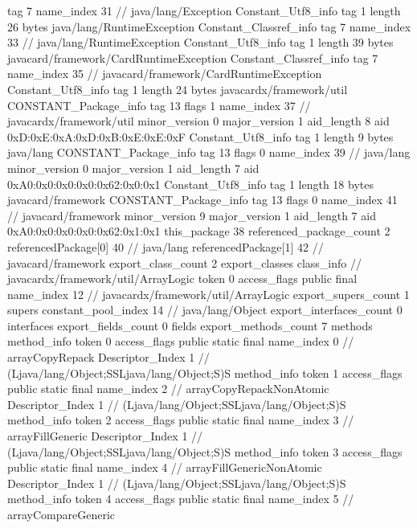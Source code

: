 {{{			tag	7
			name_index	31		// java/lang/Exception
		}
		Constant_Utf8_info {
			tag	1
			length	26
			bytes	java/lang/RuntimeException
		}
		Constant_Classref_info {
			tag	7
			name_index	33		// java/lang/RuntimeException
		}
		Constant_Utf8_info {
			tag	1
			length	39
			bytes	javacard/framework/CardRuntimeException
		}
		Constant_Classref_info {
			tag	7
			name_index	35		// javacard/framework/CardRuntimeException
		}
		Constant_Utf8_info {
			tag	1
			length	24
			bytes	javacardx/framework/util
		}
		CONSTANT_Package_info {
			tag	13
			flags	1
			name_index	37		// javacardx/framework/util
			minor_version	0
			major_version	1
			aid_length	8
			aid	0xD:0xE:0xA:0xD:0xB:0xE:0xE:0xF
		}
		Constant_Utf8_info {
			tag	1
			length	9
			bytes	java/lang
		}
		CONSTANT_Package_info {
			tag	13
			flags	0
			name_index	39		// java/lang
			minor_version	0
			major_version	1
			aid_length	7
			aid	0xA0:0x0:0x0:0x0:0x62:0x0:0x1
		}
		Constant_Utf8_info {
			tag	1
			length	18
			bytes	javacard/framework
		}
		CONSTANT_Package_info {
			tag	13
			flags	0
			name_index	41		// javacard/framework
			minor_version	9
			major_version	1
			aid_length	7
			aid	0xA0:0x0:0x0:0x0:0x62:0x1:0x1
		}
	}
	this_package	38
	referenced_package_count	2
	referencedPackage[0]	40		// java/lang
	referencedPackage[1]	42		// javacard/framework
	export_class_count	2
	export_classes {
		class_info {		// javacardx/framework/util/ArrayLogic
			token	0
			access_flags	public final
			name_index	12		// javacardx/framework/util/ArrayLogic
			export_supers_count	1
			supers {
				constant_pool_index	14		// java/lang/Object
			}
			export_interfaces_count	0
			interfaces {
			}
			export_fields_count	0
			fields {
			}
			export_methods_count	7
			methods {
				method_info {
					token	0
					access_flags	public static final
					name_index	0		// arrayCopyRepack
					Descriptor_Index	1		// (Ljava/lang/Object;SSLjava/lang/Object;S)S
				}
				method_info {
					token	1
					access_flags	public static final
					name_index	2		// arrayCopyRepackNonAtomic
					Descriptor_Index	1		// (Ljava/lang/Object;SSLjava/lang/Object;S)S
				}
				method_info {
					token	2
					access_flags	public static final
					name_index	3		// arrayFillGeneric
					Descriptor_Index	1		// (Ljava/lang/Object;SSLjava/lang/Object;S)S
				}
				method_info {
					token	3
					access_flags	public static final
					name_index	4		// arrayFillGenericNonAtomic
					Descriptor_Index	1		// (Ljava/lang/Object;SSLjava/lang/Object;S)S
				}
				method_info {
					token	4
					access_flags	public static final
					name_index	5		// arrayCompareGeneric
}}}}}
